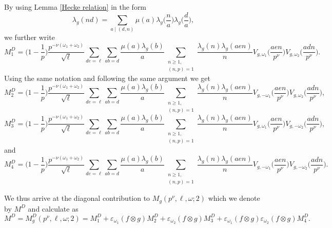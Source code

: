 \documentclass[12pt]{amsart}
\theoremstyle{plain}
\theoremstyle{definition}
\newcommand{\ve}{\varepsilon}
\begin{document}
By using Lemma \ref{Hecke relation} in the form
    \[
    \lambda_g(nd)=\sum_{a \mid (d, n)} \mu(a) \lambda_g\Big(\frac{n}{a}\Big)\lambda_g\Big(\frac{d}{a}\Big),
    \]
we further write
    \begin{equation*}\label{eq:MD1}
    M^D_{1} 
    = \Big(1-\frac{1}{p}\Big) \frac{p^{-\nu(\omega_1+\omega_2)} }{\sqrt\ell} 
     \sum_{de=\ell} 
     \sum_{ab=d} \frac{ \mu(a) \lambda_g(b)}{a}
     \sum_{\substack{n\geq 1,\\ (n, p)=1}}
    \frac{\lambda_g(n) \lambda_g(aen) }{n} 
    V_{g, \omega_1}\Big(\frac{aen}{ p^\nu }\Big)
    V_{g, \omega_2}\Big(\frac{adn}{p^\nu }\Big) .
    \end{equation*}
 Using the same notation and following the same argument we get
   \begin{equation*}\label{eq:MD2}
    M^D_{2} 
    = \Big(1-\frac{1}{p}\Big) \frac{p^{-\nu(\omega_1+\omega_2)} }{\sqrt\ell} 
     \sum_{de=\ell} 
     \sum_{ab=d} \frac{ \mu(a) \lambda_g(b)}{a}
     \sum_{\substack{n\geq 1,\\ (n, p)=1}}
    \frac{\lambda_g(n) \lambda_g(aen) }{n} 
    V_{g, -\omega_1}\Big(\frac{aen}{ p^\nu }\Big)
    V_{g, \omega_2}\Big(\frac{adn}{p^\nu }\Big),
    \end{equation*}
    \begin{equation*}\label{eq:MD3}
    M^D_{3} 
    = \Big(1-\frac{1}{p}\Big) \frac{p^{-\nu(\omega_1+\omega_2)} }{\sqrt\ell} 
     \sum_{de=\ell} 
     \sum_{ab=d} \frac{ \mu(a) \lambda_g(b)}{a}
     \sum_{\substack{n\geq 1,\\ (n, p)=1}}
    \frac{\lambda_g(n) \lambda_g(aen) }{n} 
    V_{g, \omega_1}\Big(\frac{aen}{ p^\nu }\Big)
    V_{g, -\omega_2}\Big(\frac{adn}{p^\nu }\Big) ,
    \end{equation*}
and 
\begin{equation*}\label{eq:MD4}
    M^D_{4} 
    = \Big(1-\frac{1}{p}\Big) \frac{p^{-\nu(\omega_1+\omega_2)} }{\sqrt\ell} 
     \sum_{de=\ell} 
     \sum_{ab=d} \frac{ \mu(a) \lambda_g(b)}{a}
     \sum_{\substack{n\geq 1,\\ (n, p)=1}}
    \frac{\lambda_g(n) \lambda_g(aen) }{n} 
    V_{g, -\omega_1}\Big(\frac{aen}{ p^\nu }\Big)
    V_{g, -\omega_2}\Big(\frac{adn}{p^\nu }\Big) .
    \end{equation*}

We thus arrive at the diagonal contribution to $M_g(p^{\nu},\ell, \omega; 2)$ which we denote by $M^{D}$ and calculate as
\begin{equation*}\label{eqn:MD}
    M^{D}= M^{D}_g(p^{\nu},\ell, \omega; 2)=M^{D}_1+ \ve_{\omega_1}(f\otimes g)  M^{D}_2+ \ve_{\omega_2}(f\otimes g)M^{D}_3+ \ve_{\omega_1}(f\otimes g)\ve_{\omega_2}(f\otimes g)M^{D}_4.
   \end{equation*}
\end{document}
